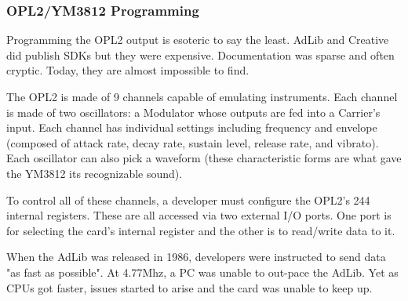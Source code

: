 \subsubsection{OPL2/YM3812 Programming}
\label{IMF_explanation}
\par
Programming the OPL2 output is esoteric to say the least. AdLib and Creative did publish SDKs but they were expensive.  Documentation was sparse and often cryptic. Today, they are almost impossible to find.\\
\par
The OPL2 is made of 9 channels capable of emulating instruments. Each channel is made of two oscillators: a Modulator whose outputs are fed into a Carrier's input. Each channel has individual settings including frequency and envelope (composed of attack rate, decay rate, sustain level, release rate, and vibrato). Each oscillator can also pick a waveform (these characteristic forms are what gave the YM3812 its recognizable sound).\\
\par
 To control all of these channels, a developer must configure the OPL2's 244 internal registers. These are all accessed via two external I/O ports. One port is for selecting the card's internal register and the other is to read/write data to it.\\
\par
\begin{minipage}{\textwidth}

\end{minipage}
\par
When the AdLib was released in 1986, developers were instructed to send data "as fast as possible". At 4.77Mhz, a PC was unable to out-pace the AdLib. Yet as CPUs got faster, issues started to arise and the card was unable to keep up.\\
\par

